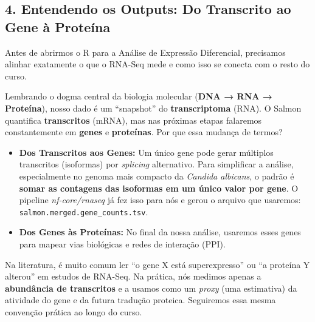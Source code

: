\documentclass[
  letterpaper,
  DIV=11,
  numbers=noendperiod]{scrreprt}
\providecommand{\tightlist}{%
  \setlength{\itemsep}{0pt}\setlength{\parskip}{0pt}}
\begin{document}
\subsection{4. Entendendo os Outputs: Do Transcrito ao Gene à
Proteína}\label{entendendo-os-outputs-do-transcrito-ao-gene-uxe0-proteuxedna}

Antes de abrirmos o R para a Análise de Expressão Diferencial,
precisamos alinhar exatamente o que o RNA-Seq mede e como isso se
conecta com o resto do curso.

Lembrando o dogma central da biologia molecular (\textbf{DNA → RNA →
Proteína}), nosso dado é um ``snapshot'' do \textbf{transcriptoma}
(RNA). O Salmon quantifica \textbf{transcritos} (mRNA), mas nas próximas
etapas falaremos constantemente em \textbf{genes} e \textbf{proteínas}.
Por que essa mudança de termos?

\begin{itemize}
\tightlist
\item
  \textbf{Dos Transcritos aos Genes:} Um único gene pode gerar múltiplos
  transcritos (isoformas) por \emph{splicing} alternativo. Para
  simplificar a análise, especialmente no genoma mais compacto da
  \emph{Candida albicans}, o padrão é \textbf{somar as contagens das
  isoformas em um único valor por gene}. O pipeline
  \emph{nf-core/rnaseq} já fez isso para nós e gerou o arquivo que
  usaremos: \texttt{salmon.merged.gene\_counts.tsv}.
\item
  \textbf{Dos Genes às Proteínas:} No final da nossa análise, usaremos
  esses genes para mapear vias biológicas e redes de interação (PPI).
\end{itemize}

\begin{tcolorbox}[enhanced jigsaw, arc=.35mm, colframe=quarto-callout-note-color-frame, breakable, bottomrule=.15mm, colback=white, left=2mm, titlerule=0mm, opacityback=0, title=\textcolor{quarto-callout-note-color}{\faInfo}\hspace{0.5em}{Atenção aos Termos}, leftrule=.75mm, colbacktitle=quarto-callout-note-color!10!white, bottomtitle=1mm, toprule=.15mm, toptitle=1mm, rightrule=.15mm, opacitybacktitle=0.6, coltitle=black]

Na literatura, é muito comum ler ``o gene X está superexpresso'' ou ``a
proteína Y alterou'' em estudos de RNA-Seq. Na prática, nós medimos
apenas a \textbf{abundância de transcritos} e a usamos como um
\emph{proxy} (uma estimativa) da atividade do gene e da futura tradução
proteica. Seguiremos essa mesma convenção prática ao longo do curso.

\end{tcolorbox}
\end{document}
